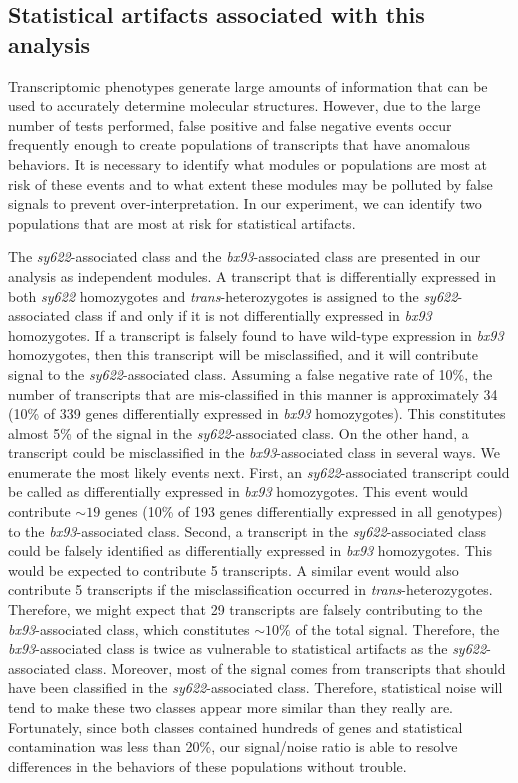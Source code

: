 \documentclass[10pt, twocolumn]{article}
\begin{document}
\subsection*{Statistical artifacts associated with this analysis}
Transcriptomic phenotypes generate large amounts of information that can be used
to accurately determine molecular structures. However, due to the large number of
tests performed, false positive and false negative events occur frequently enough
to create populations of transcripts that have anomalous behaviors. It is
necessary to identify what modules or populations are most at risk of these events
and to what extent these modules may be polluted by false signals to prevent
over-interpretation. In our experiment, we can identify two populations that are
most at risk for statistical artifacts.

The \emph{sy622}-associated class and the \emph{bx93}-associated class are
presented in our analysis as independent modules. A transcript that is
differentially expressed in both \emph{sy622} homozygotes and \emph{trans}-heterozygotes
is assigned to the \emph{sy622}-associated class if and only if it is not
differentially expressed in \emph{bx93} homozygotes. If a transcript is falsely
found to have wild-type expression in \emph{bx93} homozygotes, then this transcript
will be misclassified, and it will contribute signal to the \emph{sy622}-associated
class. Assuming a false negative
rate of 10\%, the number of transcripts that are mis-classified in this manner
is approximately 34 (10\% of 339 genes differentially expressed in \emph{bx93}
homozygotes). This constitutes almost 5\% of the signal in the \emph{sy622}-associated
class. On the other hand, a transcript could be misclassified in the
\emph{bx93}-associated class in several ways. We enumerate the most likely
events next. First, an \emph{sy622}-associated transcript could be called as
differentially expressed in \emph{bx93} homozygotes. This event would contribute
$\sim 19$ genes (10\% of 193 genes differentially expressed in all genotypes) to
the \emph{bx93}-associated class. Second, a transcript in the \emph{sy622}-associated
class could be falsely identified as differentially expressed in \emph{bx93}
homozygotes. This would be expected to contribute 5 transcripts. A similar event
would also contribute 5 transcripts if the misclassification occurred in
\emph{trans}-heterozygotes. Therefore, we might expect that 29 transcripts are
falsely contributing to the \emph{bx93}-associated class, which constitutes
$\sim 10\%$ of the total signal. Therefore, the \emph{bx93}-associated class is
twice as vulnerable to statistical artifacts as the \emph{sy622}-associated class.
Moreover, most of the signal comes from transcripts that should have been classified
in the \emph{sy622}-associated class. Therefore, statistical noise will tend
to make these two classes appear more similar than they really are. Fortunately,
since both classes contained hundreds of genes and statistical contamination
was less than 20\%, our signal/noise ratio is able to resolve differences in the
behaviors of these populations without trouble.
\end{document}
